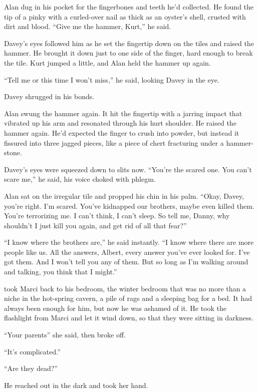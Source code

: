 Alan dug in his pocket for the fingerbones and teeth he'd collected. 
He found the tip of a pinky with a curled-over nail as thick as an
oyster's shell, crusted with dirt and blood.  ``Give me the hammer,
Kurt,'' he said.

Davey's eyes followed him as he set the fingertip down on the tiles
and raised the hammer.  He brought it down just to one side of the
finger, hard enough to break the tile.  Kurt jumped a little, and Alan
held the hammer up again.

``Tell me or this time I won't miss,'' he said, looking Davey in the
eye.

Davey shrugged in his bonds.

Alan swung the hammer again.  It hit the fingertip with a jarring
impact that vibrated up his arm and resonated through his hurt
shoulder.  He raised the hammer again.  He'd expected the finger to
crush into powder, but instead it fissured into three jagged pieces,
like a piece of chert fracturing under a hammer-stone.

Davey's eyes were squeezed down to slits now.  ``You're the scared
one.  You can't scare me,'' he said, his voice choked with phlegm.

Alan sat on the irregular tile and propped his chin in his palm. 
``Okay, Davey, you're right.  I'm scared.  You've kidnapped our
brothers, maybe even killed them.  You're terrorizing me.  I can't
think, I can't sleep.  So tell me, Danny, why shouldn't I just kill
you again, and get rid of all that fear?''

``I know where the brothers are,'' he said instantly.  ``I know where
there are more people like us.  All the answers, Albert, every answer
you've ever looked for.  I've got them.  And I won't tell you any of
them.  But so long as I'm walking around and talking, you think that I
might.''

 took Marci back to his bedroom, the winter bedroom that was no
more than a niche in the hot-spring cavern, a pile of rags and a
sleeping bag for a bed.  It had always been enough for him, but now he
was ashamed of it.  He took the flashlight from Marci and let it wind
down, so that they were sitting in darkness.

``Your parents\dash{}'' she said, then broke off.

``It's complicated.''

``Are they dead?''

He reached out in the dark and took her hand.

